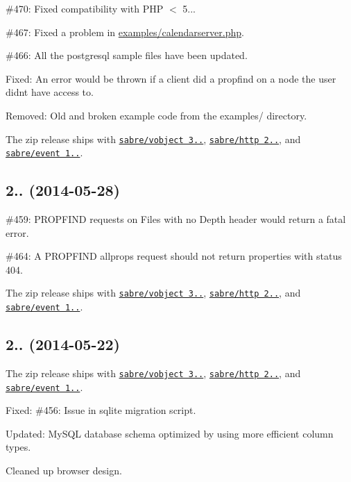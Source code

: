 \begin{DoxyItemize}
\item \#470\+: Fixed compatibility with P\+HP $<$ 5...
\item \#467\+: Fixed a problem in {\ttfamily \mbox{\hyperlink{calendarserver_8php_source}{examples/calendarserver.\+php}}}.
\item \#466\+: All the postgresql sample files have been updated.
\item Fixed\+: An error would be thrown if a client did a propfind on a node the user didn\textquotesingle{}t have access to.
\item Removed\+: Old and broken example code from the {\ttfamily examples/} directory.
\item The zip release ships with \href{http://sabre.io/vobject/}{\tt sabre/vobject 3..}, \href{http://sabre.io/http/}{\tt sabre/http 2..}, and \href{http://sabre.io/event/}{\tt sabre/event 1..}.
\end{DoxyItemize}

\subsection*{2.. (2014-\/05-\/28) }


\begin{DoxyItemize}
\item \#459\+: P\+R\+O\+P\+F\+I\+ND requests on Files with no Depth header would return a fatal error.
\item \#464\+: A P\+R\+O\+P\+F\+I\+ND allprops request should not return properties with status 404.
\item The zip release ships with \href{http://sabre.io/vobject/}{\tt sabre/vobject 3..}, \href{http://sabre.io/http/}{\tt sabre/http 2..}, and \href{http://sabre.io/event/}{\tt sabre/event 1..}.
\end{DoxyItemize}

\subsection*{2.. (2014-\/05-\/22) }


\begin{DoxyItemize}
\item The zip release ships with \href{http://sabre.io/vobject/}{\tt sabre/vobject 3..}, \href{http://sabre.io/http/}{\tt sabre/http 2..}, and \href{http://sabre.io/event/}{\tt sabre/event 1..}.
\item Fixed\+: \#456\+: Issue in sqlite migration script.
\item Updated\+: My\+S\+QL database schema optimized by using more efficient column types.
\item Cleaned up browser design.
\end{DoxyItemize}

